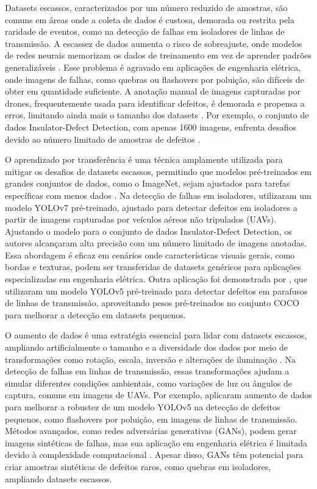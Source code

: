 Datasets escassos, caracterizados por um número reduzido de amostras, são comuns em áreas onde a coleta de dados é custosa, demorada ou restrita pela raridade de eventos, como na detecção de falhas em isoladores de linhas de transmissão. A escassez de dados aumenta o risco de sobreajuste, onde modelos de redes neurais memorizam os dados de treinamento em vez de aprender padrões generalizáveis \cite{goodfellow2016deep}. Esse problema é agravado em aplicações de engenharia elétrica, onde imagens de falhas, como quebras ou flashovers por poluição, são difíceis de obter em quantidade suficiente. A anotação manual de imagens capturadas por drones, frequentemente usada para identificar defeitos, é demorada e propensa a erros, limitando ainda mais o tamanho dos datasets \cite{zheng2022improved}. Por exemplo, o conjunto de dados Insulator-Defect Detection, com apenas 1600 imagens, enfrenta desafios devido ao número limitado de amostras de defeitos \cite{zheng2022improved}.

O aprendizado por transferência é uma técnica amplamente utilizada para mitigar os desafios de datasets escassos, permitindo que modelos pré-treinados em grandes conjuntos de dados, como o ImageNet, sejam ajustados para tarefas específicas com menos dados \cite{pan2010survey}. Na detecção de falhas em isoladores,  utilizaram um modelo YOLOv7 pré-treinado, ajustado para detectar defeitos em isoladores a partir de imagens capturadas por veículos aéreos não tripulados (UAVs). Ajustando o modelo para o conjunto de dados Insulator-Defect Detection, os autores alcançaram alta precisão com um número limitado de imagens anotadas. Essa abordagem é eficaz em cenários onde características visuais gerais, como bordas e texturas, podem ser transferidas de datasets genéricos para aplicações especializadas em engenharia elétrica. Outra aplicação foi demonstrada por , que utilizaram um modelo YOLOv5 pré-treinado para detectar defeitos em parafusos de linhas de transmissão, aproveitando pesos pré-treinados no conjunto COCO para melhorar a detecção em datasets pequenos.

O aumento de dados é uma estratégia essencial para lidar com datasets escassos, ampliando artificialmente o tamanho e a diversidade dos dados por meio de transformações como rotação, escala, inversão e alterações de iluminação \cite{shorten2019survey}. Na detecção de falhas em linhas de transmissão, essas transformações ajudam a simular diferentes condições ambientais, como variações de luz ou ângulos de captura, comuns em imagens de UAVs. Por exemplo,  aplicaram aumento de dados para melhorar a robustez de um modelo YOLOv5 na detecção de defeitos pequenos, como flashovers por poluição, em imagens de linhas de transmissão. Métodos avançados, como redes adversárias generativas (GANs), podem gerar imagens sintéticas de falhas, mas sua aplicação em engenharia elétrica é limitada devido à complexidade computacional \cite{goodfellow2014generative}. Apesar disso, GANs têm potencial para criar amostras sintéticas de defeitos raros, como quebras em isoladores, ampliando datasets escassos.

